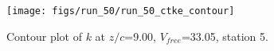 \begin{figure}[H]
\centering
\texttt{[image: figs/run\_50/run\_50\_ctke\_contour]}
\caption{Contour plot of $k$ at $z/c$=9.00, $V_{free}$=33.05, station 5.}
\end{figure}


